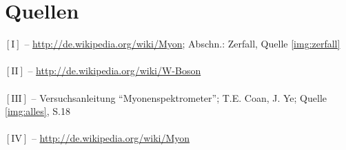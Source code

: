 \documentclass[numbers=noenddot,12pt,a4paper]{scrartcl}
\newcommand{\num}[1]{$\left[\text{#1}\right]$}
\begin{document}
\section{Quellen}
\num{I} -- \url{http://de.wikipedia.org/wiki/Myon}; Abschn.: Zerfall, Quelle \ref{img:zerfall} \\ \\
\num{II} -- \url{http://de.wikipedia.org/wiki/W-Boson}\\ \\
\num{III} -- Versuchsanleitung "`Myonenspektrometer"'; T.E. Coan, J. Ye; Quelle \ref{img:alles}, S.18\\ \\
\num{IV} -- \url{http://de.wikipedia.org/wiki/Myon} \\ \\
\end{document}
